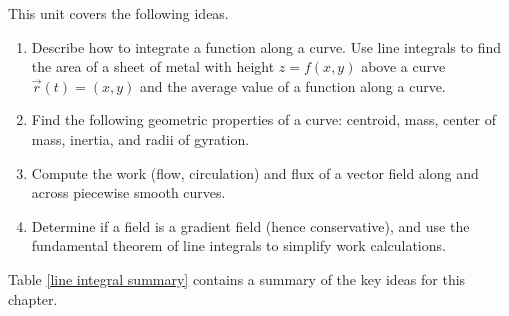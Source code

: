 \noindent 
This unit covers the following ideas.     
\begin{enumerate}
\item Describe how to integrate a function along a curve. Use line integrals to find the area of a sheet of metal with height $z=f(x,y)$ above a curve $\vec r(t)=\left(x,y\right)$ and the average value of a function along a curve.
\item Find the following geometric properties of a curve: centroid, mass, center of mass, inertia, and radii of gyration.
\item Compute the work (flow, circulation) and flux of a vector field along and across piecewise smooth curves.
\item Determine if a field is a gradient field (hence conservative), and use the fundamental theorem of line integrals to simplify work calculations.
\end{enumerate}
\vskip0.1in


\newpage

Table \ref{line integral summary} contains a summary of the key ideas for this chapter. 

